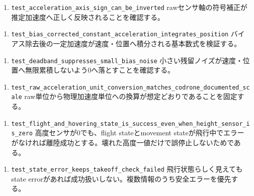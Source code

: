 \documentclass[10pt,a4paper,openany]{ltjsbook}
\begin{document}
\begin{enumerate}
\item \texttt{test\_acceleration\_axis\_sign\_can\_be\_inverted}  
rawセンサ軸の符号補正が推定加速度へ正しく反映されることを確認する。\par
\end{enumerate}
\begin{enumerate}
\item \texttt{test\_bias\_corrected\_constant\_acceleration\_integrates\_position}  
バイアス除去後の一定加速度が速度・位置へ積分される基本数式を検証する。\par
\end{enumerate}
\begin{enumerate}
\item \texttt{test\_deadband\_suppresses\_small\_bias\_noise}  
小さい残留ノイズが速度・位置へ無限累積しないよう0へ落とすことを確認する。\par
\end{enumerate}
\begin{enumerate}
\item \texttt{test\_raw\_acceleration\_unit\_conversion\_matches\_codrone\_documented\_scale}  
raw単位から物理加速度単位への換算が想定どおりであることを固定する。\par
\end{enumerate}
\begin{enumerate}
\item \texttt{test\_flight\_and\_hovering\_state\_is\_success\_even\_when\_height\_sensor\_is\_zero}  
高度センサが0でも、flight stateとmovement stateが飛行中でエラーがなければ離陸成功とする。壊れた高度一値だけで誤停止しないためである。\par
\end{enumerate}
\begin{enumerate}
\item \texttt{test\_state\_error\_keeps\_takeoff\_check\_failed}  
飛行状態らしく見えてもstate errorがあれば成功扱いしない。複数情報のうち安全エラーを優先する。\par
\end{enumerate}
\end{document}
